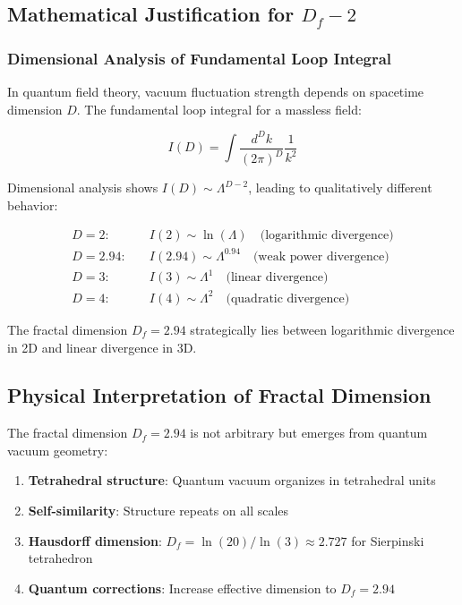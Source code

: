 \documentclass[12pt,a4paper]{article}
\theoremstyle{definition}
\begin{document}
	\subsection{Mathematical Justification for $D_f - 2$}
	
	\subsubsection{Dimensional Analysis of Fundamental Loop Integral}
	
	In quantum field theory, vacuum fluctuation strength depends on spacetime dimension $D$. The fundamental loop integral for a massless field:
	
	\begin{equation}
		I(D) = \int \frac{d^D k}{(2\pi)^D} \frac{1}{k^2}
	\end{equation}
	
	Dimensional analysis shows $I(D) \sim \Lambda^{D-2}$, leading to qualitatively different behavior:
	
	\begin{align}
		D = 2: \quad &I(2) \sim \ln(\Lambda) \quad \text{(logarithmic divergence)}\\
		D = 2.94: \quad &I(2.94) \sim \Lambda^{0.94} \quad \text{(weak power divergence)}\\
		D = 3: \quad &I(3) \sim \Lambda^{1} \quad \text{(linear divergence)}\\
		D = 4: \quad &I(4) \sim \Lambda^{2} \quad \text{(quadratic divergence)}
	\end{align}
	
	The fractal dimension $D_f = 2.94$ strategically lies between logarithmic divergence in 2D and linear divergence in 3D.
	
	\subsection{Physical Interpretation of Fractal Dimension}
	
	The fractal dimension $D_f = 2.94$ is not arbitrary but emerges from quantum vacuum geometry:
	
	\begin{enumerate}
		\item \textbf{Tetrahedral structure}: Quantum vacuum organizes in tetrahedral units
		\item \textbf{Self-similarity}: Structure repeats on all scales
		\item \textbf{Hausdorff dimension}: $D_f = \ln(20)/\ln(3) \approx 2.727$ for Sierpinski tetrahedron
		\item \textbf{Quantum corrections}: Increase effective dimension to $D_f = 2.94$
	\end{enumerate}
	
\end{document}
